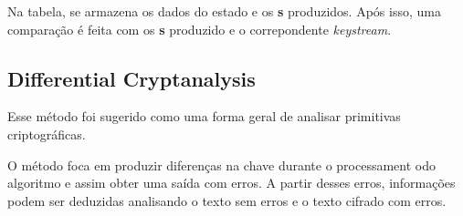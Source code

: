 Na tabela, se armazena os dados do estado e os \textbf{s} produzidos. Após isso, uma comparação é feita com os \textbf{s} produzido e o correpondente \textit{keystream}.

\subsection{Differential Cryptanalysis}
\label{differential-cryptanalysis}

Esse método foi sugerido como uma forma geral de analisar primitivas criptográficas. ~\cite{eli-orr}%

O método foca em produzir diferenças na chave durante o processament odo algoritmo e assim obter uma saída com erros. A partir desses erros, informações podem ser deduzidas analisando o texto sem erros e o texto cifrado com erros. 